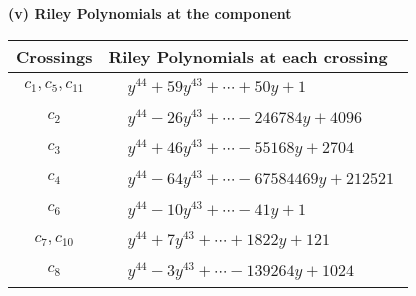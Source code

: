 \documentclass[1p]{elsarticle_modified}
\theoremstyle{definition}
\begin{document}
\newpage\renewcommand{\arraystretch}{1}
\flushleft \textbf{(v) Riley Polynomials at the component}\newline \\
\begin{tabular}{m{50pt}|m{274pt}}
Crossings & \hspace{64pt}Riley Polynomials at each crossing \\
\hline $$\begin{aligned}c_{1},c_{5},c_{11}\end{aligned}$$&$\begin{aligned}
&y^{44}+59 y^{43}+\cdots+50 y+1
\end{aligned}$\\
\hline $$\begin{aligned}c_{2}\end{aligned}$$&$\begin{aligned}
&y^{44}-26 y^{43}+\cdots-246784 y+4096
\end{aligned}$\\
\hline $$\begin{aligned}c_{3}\end{aligned}$$&$\begin{aligned}
&y^{44}+46 y^{43}+\cdots-55168 y+2704
\end{aligned}$\\
\hline $$\begin{aligned}c_{4}\end{aligned}$$&$\begin{aligned}
&y^{44}-64 y^{43}+\cdots-67584469 y+212521
\end{aligned}$\\
\hline $$\begin{aligned}c_{6}\end{aligned}$$&$\begin{aligned}
&y^{44}-10 y^{43}+\cdots-41 y+1
\end{aligned}$\\
\hline $$\begin{aligned}c_{7},c_{10}\end{aligned}$$&$\begin{aligned}
&y^{44}+7 y^{43}+\cdots+1822 y+121
\end{aligned}$\\
\hline $$\begin{aligned}c_{8}\end{aligned}$$&$\begin{aligned}
&y^{44}-3 y^{43}+\cdots-139264 y+1024
\end{aligned}$\\

\end{tabular}
\end{document}
